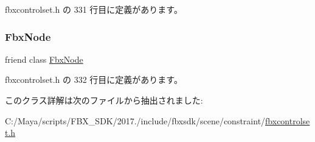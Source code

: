  fbxcontrolset.\+h の 331 行目に定義があります。

\mbox{\label{class_fbx_control_set_a7b27a89b3d5b45cd1a28960c77e4880b}} 
\subsubsection{\texorpdfstring{Fbx\+Node}{FbxNode}}
{\footnotesize\ttfamily friend class \hyperlink{class_fbx_node}{Fbx\+Node}\hspace{0.3cm}{\ttfamily [friend]}}



 fbxcontrolset.\+h の 332 行目に定義があります。



このクラス詳解は次のファイルから抽出されました\+:\begin{DoxyCompactItemize}
\item 
C\+:/\+Maya/scripts/\+F\+B\+X\+\_\+\+S\+D\+K/2017./include/fbxsdk/scene/constraint/\hyperlink{fbxcontrolset_8h}{fbxcontrolset.\+h}\end{DoxyCompactItemize}
